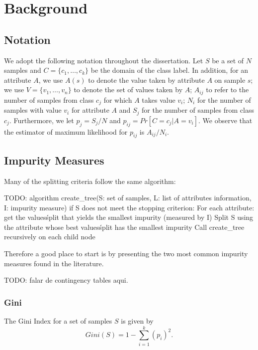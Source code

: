 \newpage

\chapter{Background}
\label{chap:background}

\section{Notation}
\label{sec:notation}
We adopt the following notation throughout the dissertation.
Let $S$ be a set of $N$ samples and 
 $C=\{c_1,\ldots,c_k\}$ be the domain of the class label. 
In addition, for an attribute  $A$, we use $A(s)$ to denote the value taken by attribute
$A$ on sample $s$; we use 
  $V=\{ v_1,\ldots,v_n \}$ to denote the set of values
taken by $A$;
$A_{ij}$ to refer to the  number of samples
from class $c_j$ for which  $A$ takes value $v_i$; 
 $N_i$ for the number of samples with value $v_i$ for attribute $A$
and $S_j$ for the number of samples from class $c_j$.
Furthermore, we let $p_j = S_j /N$ and $p_{ij}= Pr[C=c_j | A = v_i]$.
We observe that the estimator of maximum likelihood for $p_{ij} $ is
$A_{ij} / N_i$.  

\section{Impurity Measures}
Many of the splitting criteria follow the same algorithm:

TODO: algorithm
create_tree(S: set of samples, L: list of attributes information, I: impurity measure)
if S does not meet the stopping criterion:
    For each attribute:
        get the values\' split that yields the smallest impurity (measured by I)
    Split S using the attribute whose best values\' split has the smallest impurity
    Call create_tree recursively on each child node

Therefore a good place to start is by presenting the two most common impurity measures found in the literature.

TODO: falar de contingency tables aqui.

\subsection{Gini}
The Gini Index for a set of samples $S$ is given by 
\begin{equation}
 Gini(S) =  1- \sum_{i=1}^k (p_i)^2 .
\label{eq:gini}
\end{equation}

